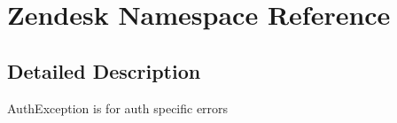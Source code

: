 \hypertarget{namespace_zendesk}{}\section{Zendesk Namespace Reference}
\label{namespace_zendesk}


\subsection{Detailed Description}
Auth\+Exception is for auth specific errors  
